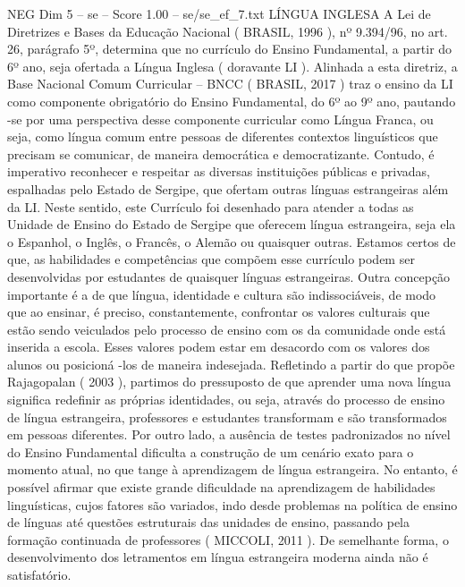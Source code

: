 \begin{textsample}{NEG Dim 5 – se – Score 1.00 – se/se\_ef\_7.txt}  \label{ex:f5_neg_159}
LÍNGUA INGLESA A Lei de Diretrizes e Bases da Educação Nacional ( BRASIL, 1996 ), nº 9.394/96, no art. 26, parágrafo 5º, determina que no currículo do Ensino Fundamental, a partir do 6º ano, seja ofertada a Língua Inglesa ( doravante LI ).
Alinhada a esta diretriz, a Base Nacional Comum Curricular – BNCC ( BRASIL, 2017 ) traz o ensino da LI como componente obrigatório do Ensino Fundamental, do 6º ao 9º ano, pautando -se por uma perspectiva desse componente curricular como Língua Franca, ou seja, como língua comum entre pessoas de diferentes contextos linguísticos que precisam se comunicar, de maneira democrática e democratizante.
Contudo, é imperativo reconhecer e respeitar as diversas instituições públicas e privadas, espalhadas pelo Estado de Sergipe, que ofertam outras línguas estrangeiras além da LI.
Neste sentido, este Currículo foi desenhado para atender a todas as Unidade de Ensino do Estado de Sergipe que oferecem língua estrangeira, seja ela o Espanhol, o Inglês, o Francês, o Alemão ou quaisquer outras.
Estamos certos de que, as habilidades e competências que compõem esse currículo podem ser desenvolvidas por estudantes de quaisquer línguas estrangeiras.
Outra concepção importante é a de que língua, identidade e cultura são indissociáveis, de modo que ao ensinar, é preciso, constantemente, confrontar os valores culturais que estão sendo veiculados pelo processo de ensino com os da comunidade onde está inserida a escola.
Esses valores podem estar em desacordo com os valores dos alunos ou posicioná -los de maneira indesejada.
Refletindo a partir do que propõe Rajagopalan ( 2003 ), partimos do pressuposto de que aprender uma nova língua significa redefinir as próprias identidades, ou seja, através do processo de ensino de língua estrangeira, professores e estudantes transformam e são transformados em pessoas diferentes.
Por outro lado, a ausência de testes padronizados no nível do Ensino Fundamental dificulta a construção de um cenário exato para o momento atual, no que tange à aprendizagem de língua estrangeira.
No entanto, é possível afirmar que existe grande dificuldade na aprendizagem de habilidades linguísticas, cujos fatores são variados, indo desde problemas na política de ensino de línguas até questões estruturais das unidades de ensino, passando pela formação continuada de professores ( MICCOLI, 2011 ).
De semelhante forma, o desenvolvimento dos letramentos em língua estrangeira moderna ainda não é satisfatório.

\end{textsample}
